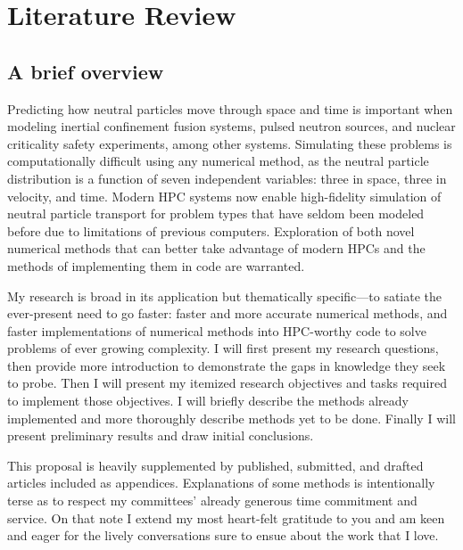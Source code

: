 

\chapter{Literature Review}
\label{part:literature}


\section {A brief overview}
Predicting how neutral particles move through space and time is important when modeling inertial confinement fusion systems, pulsed neutron sources, and nuclear criticality safety experiments, among other systems.
Simulating these problems is computationally difficult using any numerical method, as the neutral particle distribution is a function of seven independent variables: three in space, three in velocity, and time.
Modern HPC systems now enable high-fidelity simulation of neutral particle transport for problem types that have seldom been modeled before due to limitations of previous computers. %
Exploration of both novel numerical methods that can better take advantage of modern HPCs and the methods of implementing them in code are warranted.

My research is broad in its application but thematically specific---to satiate the ever-present need to go faster: faster and more accurate numerical methods, and faster implementations of numerical methods into HPC-worthy code to solve problems of ever growing complexity.
I will first present my research questions, then provide more introduction to demonstrate the gaps in knowledge they seek to probe.
Then I will present my itemized research objectives and tasks required to implement those objectives.
I will briefly describe the methods already implemented and more thoroughly describe methods yet to be done.
Finally I will present preliminary results and draw initial conclusions.

This proposal is heavily supplemented by published, submitted, and drafted articles included as appendices.
Explanations of some methods is intentionally terse as to respect my committees' already generous time commitment and service.
On that note I extend my most heart-felt gratitude to you and am keen and eager for the lively conversations sure to ensue about the work that I love.

